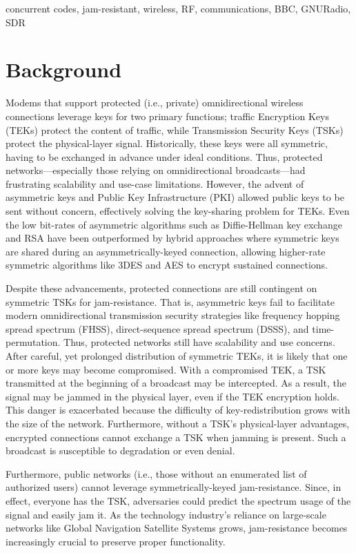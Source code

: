 \documentclass[conference]{IEEEtran}
\begin{document}
\renewcommand\IEEEkeywordsname{Keywords}
\begin{IEEEkeywords}
concurrent codes, jam-resistant, wireless, RF, communications, BBC, GNURadio, SDR
\end{IEEEkeywords}


\section{Background}
Modems that support protected (i.e., private) omnidirectional wireless connections leverage keys for two primary functions; traffic Encryption Keys (TEKs) protect the content of traffic, while Transmission Security Keys (TSKs) protect the physical-layer signal. Historically, these keys were all symmetric, having to be exchanged in advance under ideal conditions. Thus, protected networks—especially those relying on omnidirectional broadcasts—had frustrating scalability and use-case limitations. However, the advent of asymmetric keys and Public Key Infrastructure (PKI) allowed public keys to be sent without concern, effectively solving the key-sharing problem for TEKs. Even the low bit-rates of asymmetric algorithms such as Diffie-Hellman key exchange and RSA have been outperformed by hybrid approaches where symmetric keys are shared during an asymmetrically-keyed connection, allowing higher-rate symmetric algorithms like 3DES and AES to encrypt sustained connections. \cite{thesis}

Despite these advancements, protected connections are still contingent on symmetric TSKs for jam-resistance. That is, asymmetric keys fail to facilitate modern omnidirectional transmission security strategies like frequency hopping spread spectrum (FHSS), direct-sequence spread spectrum (DSSS), and time-permutation. Thus, protected networks still have scalability and use concerns. After careful, yet prolonged distribution of symmetric TEKs, it is likely that one or more keys may become compromised. With a compromised TEK, a TSK transmitted at the beginning of a broadcast may be intercepted. As a result, the signal may be jammed in the physical layer, even if the TEK encryption holds. This danger is exacerbated because the difficulty of key-redistribution grows with the size of the network. Furthermore, without a TSK's physical-layer advantages, encrypted connections cannot exchange a TSK when jamming is present. Such a broadcast is susceptible to degradation or even denial.

Furthermore, public networks (i.e., those without an enumerated list of authorized users) cannot leverage symmetrically-keyed jam-resistance. Since, in effect, everyone has the TSK, adversaries could predict the spectrum usage of the signal and easily jam it. As the technology industry's reliance on large-scale networks like Global Navigation Satellite Systems grows, jam-resistance becomes increasingly crucial to preserve proper functionality. 
\end{document}
